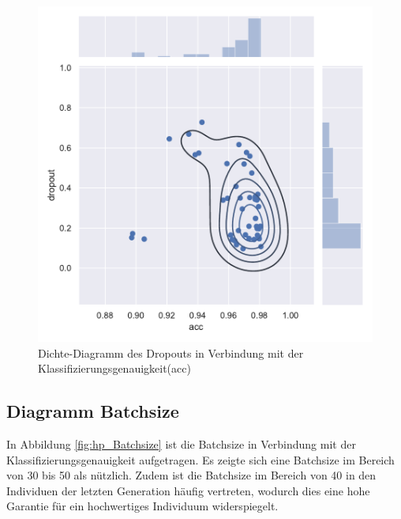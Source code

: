 \begin{figure}[h]
  \centering  
  \includegraphics[scale=0.9]{img/hp_dropout.pdf}
  \caption{Dichte-Diagramm des Dropouts in Verbindung mit der Klassifizierungsgenauigkeit(acc)}
  \label{fig:hp_Dropout}
\end{figure}

\newpage

\subsection{Diagramm Batchsize}
In Abbildung \ref{fig:hp_Batchsize} ist die Batchsize in Verbindung mit der Klassifizierungsgenauigkeit aufgetragen. Es zeigte sich eine Batchsize im Bereich von 30 bis 50 als nützlich. Zudem ist die Batchsize im Bereich von 40 in den Individuen der letzten Generation häufig vertreten, wodurch dies eine hohe Garantie für ein hochwertiges Individuum widerspiegelt.

